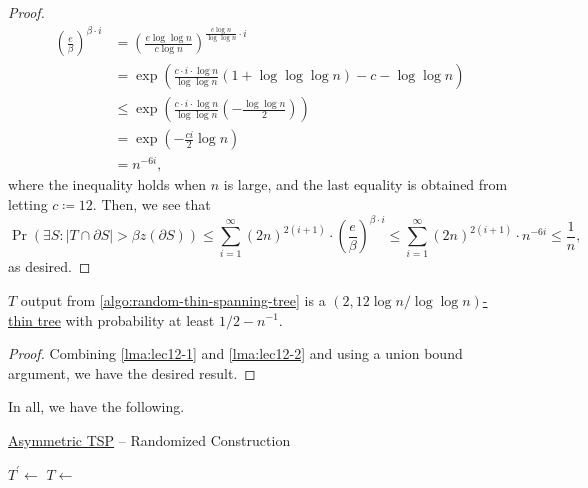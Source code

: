 \begin{proof}
	\[
		\begin{split}
			\left( \frac{e}{\beta } \right) ^{\beta \cdot i}
			 & = \left( \frac{e \log \log n}{c \log n} \right) ^{\frac{c\log n}{\log \log n}\cdot i}                    \\
			 & = \exp \left( \frac{c\cdot i\cdot \log n}{\log \log n}(1 + \log \log \log n) - c - \log \log n \right)   \\
			 & \leq \exp \left( \frac{c\cdot i\cdot \log n}{\log \log n} \left( - \frac{\log \log n}{2} \right) \right) \\
			 & = \exp \left( - \frac{ci}{2}\log n \right)                                                               \\
			 & = n^{-6i},
		\end{split}
	\]
	where the inequality holds when \(n\) is large, and the last equality is obtained from letting \(c \coloneqq 12\). Then, we see that
	\[
		\Pr(\exists S\colon \left\vert T \cap \partial S \right\vert > \beta z(\partial S))
		\leq \sum_{i=1}^{\infty} (2n)^{2(i+1)} \cdot \left( \frac{e}{\beta } \right) ^{\beta \cdot i}
		\leq \sum_{i=1}^{\infty} (2n)^{2(i+1)} \cdot n^{-6i} \leq \frac{1}{n},
	\]
	as desired.
\end{proof}

\begin{theorem}\label{thm:lec12-1}
	\(T\) output from \autoref{algo:random-thin-spanning-tree} is a \hyperref[def:thin]{\((2, 12\log n / \log \log n)\)-thin tree} with probability at least \(1 / 2 - n^{-1} \).
\end{theorem}
\begin{proof}
	Combining \autoref{lma:lec12-1} and \autoref{lma:lec12-2} and using a union bound argument, we have the desired result.
\end{proof}

In all, we have the following.

\begin{algorithm}[H]\label{algo:random-construct-tour}
	\DontPrintSemicolon
	\caption{\hyperref[prb:ATSP]{Asymmetric TSP} -- Randomized Construction}
	\BlankLine
	\(T^\prime\gets\)\;
	\(T\gets\)\;
	\;
\end{algorithm}

